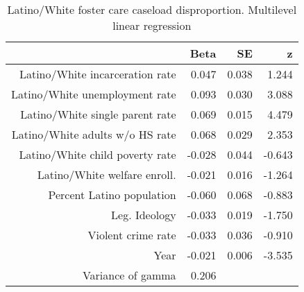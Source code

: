 \begin{table}[ht]
\centering
\begin{tabular}{rrrr}
  \hline
 & Beta & SE & z \\ 
  \hline
Latino/White incarceration rate & 0.047 & 0.038 & 1.244 \\ 
  Latino/White unemployment rate & 0.093 & 0.030 & 3.088 \\ 
  Latino/White single parent rate & 0.069 & 0.015 & 4.479 \\ 
  Latino/White adults w/o HS rate & 0.068 & 0.029 & 2.353 \\ 
  Latino/White child poverty rate & -0.028 & 0.044 & -0.643 \\ 
  Latino/White welfare enroll.  & -0.021 & 0.016 & -1.264 \\ 
  Percent Latino population & -0.060 & 0.068 & -0.883 \\ 
  Leg. Ideology & -0.033 & 0.019 & -1.750 \\ 
  Violent crime rate & -0.033 & 0.036 & -0.910 \\ 
  Year & -0.021 & 0.006 & -3.535 \\ 
  Variance of gamma & 0.206 &  &  \\ 
   \hline
\end{tabular}
\caption{Latino/White foster care caseload disproportion. Multilevel linear regression} 
\label{l.c.tab}
\end{table}

